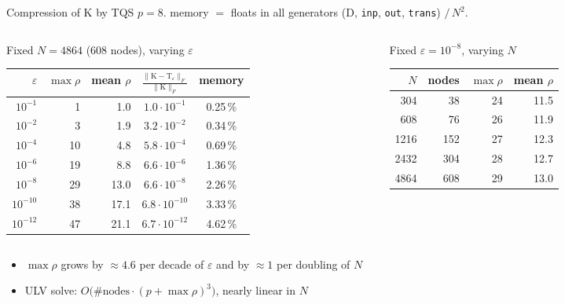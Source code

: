 \documentclass[aspectratio=169,11pt]{beamer}
\begin{document}
\begin{frame}{Compression of $\mathrm{K}$ by TQS}
\small
$p=8$. memory $=$ floats in all generators ($\mathrm{D}$, \texttt{inp}, \texttt{out}, \texttt{trans}) $/\,N^2$.
\vspace{1mm}
\begin{columns}[T]
\begin{column}{0.6\textwidth}
\centering
Fixed $N=4864$ ($608$ nodes), varying $\varepsilon$\\[1mm]
\footnotesize
\begin{tabular}{@{}rrrcc@{}}
\toprule
$\varepsilon$ & $\max\rho$ & mean $\rho$ & $\frac{\|\mathrm{K}-\mathrm{T}_\varepsilon\|_F}{\|\mathrm{K}\|_F}$ & memory \\
\midrule
$10^{-1}$  & 1  & 1.0  & $1.0\cdot10^{-1}$  & 0.25\,\% \\
$10^{-2}$  & 3  & 1.9  & $3.2\cdot10^{-2}$  & 0.34\,\% \\
$10^{-4}$  & 10 & 4.8  & $5.8\cdot10^{-4}$  & 0.69\,\% \\
$10^{-6}$  & 19 & 8.8  & $6.6\cdot10^{-6}$  & 1.36\,\% \\
$10^{-8}$  & 29 & 13.0 & $6.6\cdot10^{-8}$  & 2.26\,\% \\
$10^{-10}$ & 38 & 17.1 & $6.8\cdot10^{-10}$ & 3.33\,\% \\
$10^{-12}$ & 47 & 21.1 & $6.7\cdot10^{-12}$ & 4.62\,\% \\
\bottomrule
\end{tabular}
\end{column}
\begin{column}{0.36\textwidth}
\centering
Fixed $\varepsilon=10^{-8}$, varying $N$\\[1mm]
\footnotesize
\begin{tabular}{@{}rrrr@{}}
\toprule
$N$ & nodes & $\max\rho$ & mean $\rho$ \\
\midrule
304  & 38  & 24 & 11.5 \\
608  & 76  & 26 & 11.9 \\
1216 & 152 & 27 & 12.3 \\
2432 & 304 & 28 & 12.7 \\
4864 & 608 & 29 & 13.0 \\
\bottomrule
\end{tabular}
\end{column}
\end{columns}
\vspace{2mm}
\begin{itemize}
\item $\max\rho$ grows by $\approx4.6$ per decade of $\varepsilon$ and by $\approx1$ per doubling of $N$
\item ULV solve: $O\big(\#\text{nodes}\cdot(p+\max\rho)^3\big)$, nearly linear in $N$
\end{itemize}
\end{frame}
\end{document}
